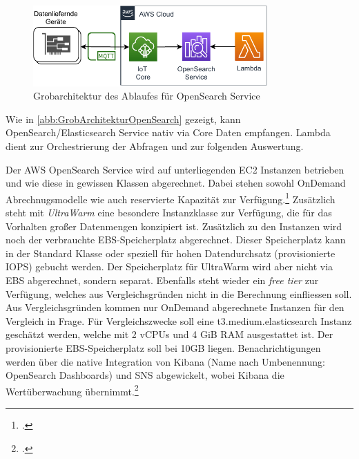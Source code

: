 \begin{figure}[H]
\centering
\includegraphics[width=0.8\textwidth]{graphics/OpenSearch-general.pdf}
\caption{Grobarchitektur des Ablaufes für OpenSearch Service}
\label{abb:GrobArchitekturOpenSearch}
\end{figure}
Wie in \autoref{abb:GrobArchitekturOpenSearch} gezeigt, kann OpenSearch/Elasticsearch Service nativ via \AWSIOT{} Core Daten empfangen. Lambda dient zur Orchestrierung der Abfragen und zur folgenden Auswertung.

Der \ac{AWS} OpenSearch Service wird auf unterliegenden \ac{EC2} Instanzen betrieben und wie diese in gewissen Klassen abgerechnet. Dabei stehen sowohl OnDemand Abrechnugsmodelle wie auch reservierte Kapazität zur Verfügung.\footcite[Vgl. auch im Folgenden][]{AmazonWebServicesInc..o.J.w} Zusätzlich steht mit \textit{UltraWarm} eine besondere Instanzklasse zur Verfügung, die für das Vorhalten großer Datenmengen konzipiert ist. Zusätzlich zu den Instanzen wird noch der verbrauchte \ac{EBS}-Speicherplatz abgerechnet. Dieser Speicherplatz kann in der Standard Klasse oder speziell für hohen Datendurchsatz (provisionierte \ac{IOPS}) gebucht werden. Der Speicherplatz für UltraWarm wird aber nicht via \ac{EBS} abgerechnet, sondern separat. Ebenfalls steht wieder ein \textit{free tier} zur Verfügung, welches aus Vergleichsgründen nicht in die Berechnung einfliessen soll. Aus Vergleichsgründen kommen nur OnDemand abgerechnete Instanzen für den Vergleich in Frage. Für Vergleichszwecke soll eine t3.medium.elasticsearch Instanz geschätzt werden, welche mit 2 vCPUs und 4 GiB \ac{RAM} ausgestattet ist. Der provisionierte \ac{EBS}-Speicherplatz soll bei 10GB liegen.
Benachrichtigungen werden über die native Integration von Kibana (Name nach Umbenennung: OpenSearch Dashboards) und \ac{SNS} abgewickelt, wobei Kibana die Wertüberwachung übernimmt.\footcite[Vgl.][]{AmazonWebServicesInc..o.J.x}

